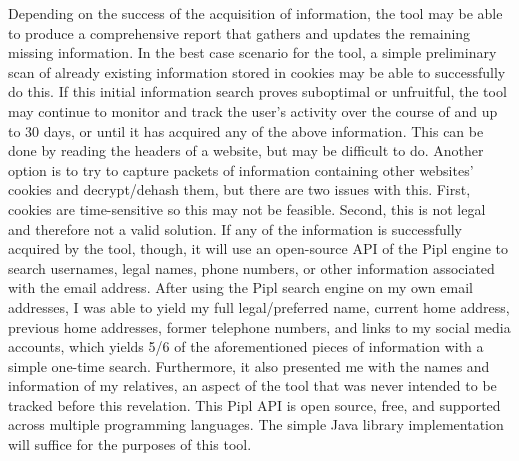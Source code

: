 \documentclass[11pt]{article}
\begin{document}
Depending on the success of the acquisition of information, the tool may be able to produce a comprehensive report that gathers and updates the remaining missing information. In the best case scenario for the tool, a simple preliminary scan of already existing information stored in cookies may be able to successfully do this. If this initial information search proves suboptimal or unfruitful, the tool may continue to monitor and track the user's activity over the course of and up to 30 days, or until it has acquired any of the above information. This can be done by reading the headers of a website, but may be difficult to do. Another option is to try to capture packets of information containing other websites' cookies and decrypt/dehash them, but there are two issues with this. First, cookies are time-sensitive so this may not be feasible. Second, this is not legal and therefore not a valid solution. If any of the information is successfully acquired by the tool, though, it will use an open-source API of the Pipl engine to search usernames, legal names, phone numbers, or other information associated with the email address\cite{pipl-api}. After using the Pipl search engine on my own email addresses, I was able to yield my full legal/preferred name, current home address, previous home addresses, former telephone numbers, and links to my social media accounts, which yields 5/6 of the aforementioned pieces of information with a simple one-time search. Furthermore, it also presented me with the names and information of my relatives, an aspect of the tool that was never intended to be tracked before this revelation. This Pipl API is open source, free, and supported across multiple programming languages. The simple Java library implementation will suffice for the purposes of this tool.
\end{document}
